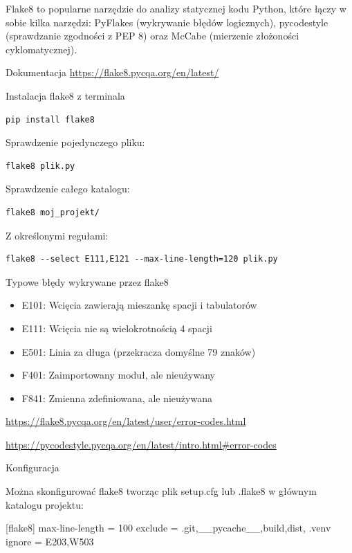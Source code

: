 \documentclass[
  polish,
  letterpaper,
  DIV=11,
  numbers=noendperiod]{scrreprt}
\newenvironment{Shaded}{\begin{snugshade}}{\end{snugshade}}
\newcommand{\NormalTok}[1]{\textcolor[rgb]{0.00,0.23,0.31}{#1}}
\providecommand{\tightlist}{%
  \setlength{\itemsep}{0pt}\setlength{\parskip}{0pt}}
\begin{document}
Flake8 to popularne narzędzie do analizy statycznej kodu Python, które
łączy w sobie kilka narzędzi: PyFlakes (wykrywanie błędów logicznych),
pycodestyle (sprawdzanie zgodności z PEP 8) oraz McCabe (mierzenie
złożoności cyklomatycznej).

Dokumentacja \url{https://flake8.pycqa.org/en/latest/}

Instalacja flake8 z terminala

\begin{verbatim}
pip install flake8
\end{verbatim}

Sprawdzenie pojedynczego pliku:

\begin{verbatim}
flake8 plik.py
\end{verbatim}

Sprawdzenie całego katalogu:

\begin{verbatim}
flake8 moj_projekt/
\end{verbatim}

Z określonymi regułami:

\begin{verbatim}
flake8 --select E111,E121 --max-line-length=120 plik.py
\end{verbatim}

Typowe błędy wykrywane przez flake8

\begin{itemize}
\tightlist
\item
  E101: Wcięcia zawierają mieszankę spacji i tabulatorów
\item
  E111: Wcięcia nie są wielokrotnością 4 spacji
\item
  E501: Linia za długa (przekracza domyślne 79 znaków)
\item
  F401: Zaimportowany moduł, ale nieużywany
\item
  F841: Zmienna zdefiniowana, ale nieużywana
\end{itemize}

\url{https://flake8.pycqa.org/en/latest/user/error-codes.html}

\url{https://pycodestyle.pycqa.org/en/latest/intro.html\#error-codes}

Konfiguracja

Można skonfigurować flake8 tworząc plik setup.cfg lub .flake8 w głównym
katalogu projektu:

\begin{Shaded}
\begin{Highlighting}[]
\NormalTok{[flake8]}
\NormalTok{max{-}line{-}length = 100}
\NormalTok{exclude = .git,\_\_pycache\_\_,build,dist, .venv}
\NormalTok{ignore = E203,W503}
\end{Highlighting}
\end{Shaded}
\end{document}
